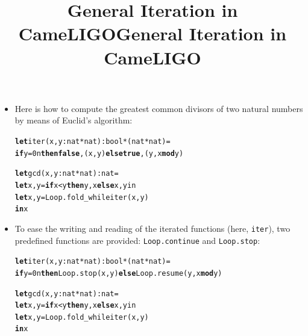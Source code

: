 \documentclass[wide]{slides}
\newcommand{\Kelse}[0]{\textbf{else}\xspace}
\newcommand{\Kif}[0]{\textbf{if}\xspace}
\newcommand{\Kin}[0]{\textbf{in}\xspace}
\newcommand{\Kmod}[0]{\textbf{mod}\xspace}
\newcommand{\Kthen}[0]{\textbf{then}\xspace}
\newcommand{\Kfalse}[0]{\textbf{false}\xspace}
\newcommand{\Klet}[0]{\textbf{let}\xspace}
\newcommand{\Ktrue}[0]{\textbf{true}\xspace}
\begin{document}
\begin{slide}
  \title{General Iteration in CameLIGO}

  \begin{itemize}

    \item Here is how to compute the greatest common divisors of two
      natural numbers by means of Euclid's algorithm:
    \begin{alltt}
\Klet iter (x,y : nat * nat) : bool * (nat * nat) =
  \Kif y = 0n \Kthen \Kfalse, (x,y) \Kelse \Ktrue, (y, x \Kmod y)

\Klet gcd (x,y : nat * nat) : nat =
  \Klet x,y = \Kif x < y \Kthen y,x \Kelse x,y in
  \Klet x,y = Loop.fold\_while iter (x,y)
  \Kin x
    \end{alltt}

  \end{itemize}

\end{slide}

\begin{slide}
  \title{General Iteration in CameLIGO}

  \begin{itemize}

    \item To ease the writing and reading of the iterated functions
      (here, \texttt{iter}), two predefined functions are provided:
      \texttt{Loop.continue} and \texttt{Loop.stop}:
      \begin{alltt}
\Klet iter (x,y : nat * nat) : bool * (nat * nat) =
  \Kif y = 0n \Kthen Loop.stop (x,y) \Kelse Loop.resume (y, x \Kmod y)

\Klet gcd (x,y : nat * nat) : nat =
  \Klet x,y = \Kif x < y \Kthen y,x \Kelse x,y in
  \Klet x,y = Loop.fold\_while iter (x,y)
  \Kin x
      \end{alltt}

  \end{itemize}

\end{slide}
\end{document}
